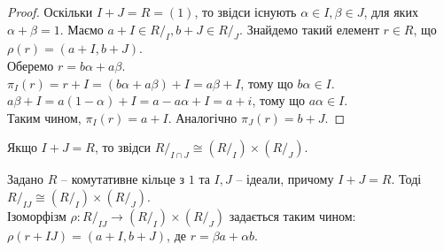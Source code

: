 \documentclass{math_library}
\begin{document}
\begin{proof}
Оскільки $I+J = R = (1)$, то звідси існують $\alpha \in I, \beta \in J$, для яких $\alpha + \beta = 1$. Маємо $a+I \in R/_I, b+J \in R/_J$. Знайдемо такий елемент $r \in R$, що $\rho(r) = (a+I,b+J)$.\\
Оберемо $r = b \alpha + a \beta$.\\
$\pi_I(r) = r+I = (b\alpha + a \beta) + I = a \beta + I$, тому що $b\alpha \in I$.\\
$a \beta + I = a(1-\alpha) + I = a - a \alpha + I = a + i$, тому що $a \alpha \in I$.\\
Таким чином, $\pi_I(r) = a+I$. Аналогічно $\pi_J(r) = b+J$.
\end{proof}

\begin{corollary}
Якщо $I+J = R$, то звідси $R/_{I \cap J} \cong (R/_I) \times (R/_J)$.
\end{corollary}

\begin{theorem}
Задано $R$ -- комутативне кільце з $1$ та $I,J$ -- ідеали, причому $I+J = R$. Тоді $R/_{IJ} \cong (R/_I) \times (R/_J)$. \\ Ізоморфізм $\rho \colon R/_{IJ} \to (R/_I) \times (R/_J)$ задається таким чином:\\
$\rho(r + IJ) = (a+I, b+J)$, де $r = \beta a + \alpha b$.
\end{theorem}
\end{document}
